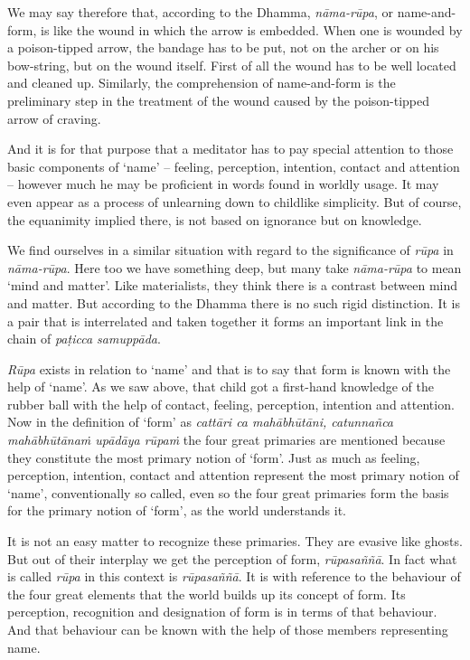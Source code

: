 We may say therefore that, according to the Dhamma, \emph{nāma-rūpa}, or name-and-form, is like the wound in which the arrow is embedded. When one is wounded by a poison-tipped arrow, the bandage has to be put, not on the archer or on his bow-string, but on the wound itself. First of all the wound has to be well located and cleaned up. Similarly, the comprehension of name-and-form is the preliminary step in the treatment of the wound caused by the poison-tipped arrow of craving.

And it is for that purpose that a meditator has to pay special attention to those basic components of `name' -- feeling, perception, intention, contact and attention -- however much he may be proficient in words found in worldly usage. It may even appear as a process of unlearning down to childlike simplicity. But of course, the equanimity implied there, is not based on ignorance but on knowledge.

We find ourselves in a similar situation with regard to the significance of \emph{rūpa} in \emph{nāma-rūpa}. Here too we have something deep, but many take \emph{nāma-rūpa} to mean `mind and matter'. Like materialists, they think there is a contrast between mind and matter. But according to the Dhamma there is no such rigid distinction. It is a pair that is interrelated and taken together it forms an important link in the chain of \emph{paṭicca samuppāda}.

\emph{Rūpa} exists in relation to `name' and that is to say that form is known with the help of `name'. As we saw above, that child got a first-hand knowledge of the rubber ball with the help of contact, feeling, perception, intention and attention. Now in the definition of `form' as \emph{cattāri ca mahābhūtāni, catunnañca mahābhūtānaṁ upādāya rūpaṁ} the four great primaries are mentioned because they constitute the most primary notion of `form'. Just as much as feeling, perception, intention, contact and attention represent the most primary notion of `name', conventionally so called, even so the four great primaries form the basis for the primary notion of `form', as the world understands it.

It is not an easy matter to recognize these primaries. They are evasive like ghosts. But out of their interplay we get the perception of form, \emph{rūpasaññā}. In fact what is called \emph{rūpa} in this context is \emph{rūpasaññā}. It is with reference to the behaviour of the four great elements that the world builds up its concept of form. Its perception, recognition and designation of form is in terms of that behaviour. And that behaviour can be known with the help of those members representing name.

